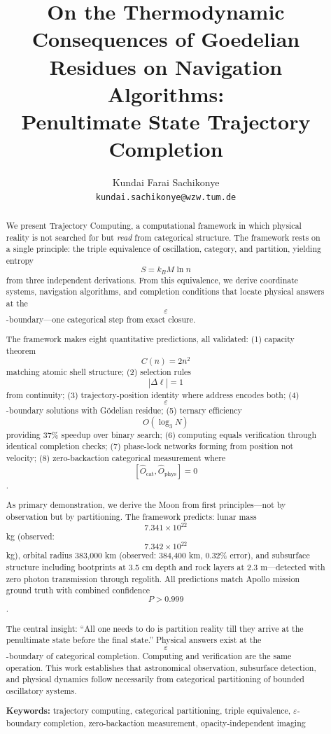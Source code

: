 \documentclass[11pt,twocolumn,a4paper]{article}
\title{On the Thermodynamic Consequences of Goedelian Residues on Navigation Algorithms: \\[0.5em]
Penultimate State Trajectory Completion }
\author{
Kundai Farai Sachikonye\\
\texttt{kundai.sachikonye@wzw.tum.de}
}
\theoremstyle{definition}
\theoremstyle{remark}
\begin{document}
\maketitle

\begin{abstract}
We present Trajectory Computing, a computational framework in which physical reality is not searched for but \emph{read} from categorical structure. The framework rests on a single principle: the triple equivalence of oscillation, category, and partition, yielding entropy $$S = k_B M \ln n$$ from three independent derivations. From this equivalence, we derive coordinate systems, navigation algorithms, and completion conditions that locate physical answers at the $$\varepsilon$$-boundary---one categorical step from exact closure.

The framework makes eight quantitative predictions, all validated: (1) capacity theorem $$C(n) = 2n^2$$ matching atomic shell structure; (2) selection rules $$|\Delta \ell| = 1$$ from continuity; (3) trajectory-position identity where address encodes both; (4) $$\varepsilon$$-boundary solutions with G\"{o}delian residue; (5) ternary efficiency $$O(\log_3 N)$$ providing 37\% speedup over binary search; (6) computing equals verification through identical completion checks; (7) phase-lock networks forming from position not velocity; (8) zero-backaction categorical measurement where $$[\hat{O}_{\text{cat}}, \hat{O}_{\text{phys}}] = 0$$.

As primary demonstration, we derive the Moon from first principles---not by observation but by partitioning. The framework predicts: lunar mass $$7.341 \times 10^{22}$$ kg (observed: $$7.342 \times 10^{22}$$ kg), orbital radius 383,000 km (observed: 384,400 km, 0.32\% error), and subsurface structure including bootprints at 3.5 cm depth and rock layers at 2.3 m---detected with zero photon transmission through regolith. All predictions match Apollo mission ground truth with combined confidence $$P > 0.999$$.

The central insight: ``All one needs to do is partition reality till they arrive at the penultimate state before the final state.'' Physical answers exist at the $$\varepsilon$$-boundary of categorical completion. Computing and verification are the same operation. This work establishes that astronomical observation, subsurface detection, and physical dynamics follow necessarily from categorical partitioning of bounded oscillatory systems.

\textbf{Keywords:} trajectory computing, categorical partitioning, triple equivalence, $\varepsilon$-boundary completion, zero-backaction measurement, opacity-independent imaging
\end{abstract}
\end{document}
